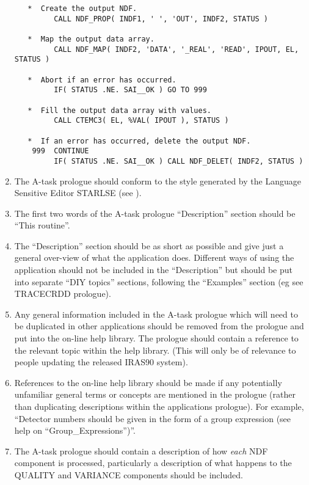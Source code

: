 \begin{enumerate}
\small
\begin{verbatim}
   *  Create the output NDF.
         CALL NDF_PROP( INDF1, ' ', 'OUT', INDF2, STATUS )

   *  Map the output data array.
         CALL NDF_MAP( INDF2, 'DATA', '_REAL', 'READ', IPOUT, EL, STATUS )

   *  Abort if an error has occurred.
         IF( STATUS .NE. SAI__OK ) GO TO 999

   *  Fill the output data array with values.
         CALL CTEMC3( EL, %VAL( IPOUT ), STATUS )

   *  If an error has occurred, delete the output NDF.
    999  CONTINUE
         IF( STATUS .NE. SAI__OK ) CALL NDF_DELET( INDF2, STATUS )
\end{verbatim}
\normalsize

\item The A-task prologue should conform to the style generated by the Language 
Sensitive Editor {\small STARLSE}
(see ).

\item The first two words of the A-task prologue ``Description'' section should be ``This 
routine''.

\item The ``Description'' section should be as short as possible and give just a
general over-view of what the application does. Different ways of using the
application should not be included in the ``Description'' but should be put into
separate ``DIY topics'' sections, following the ``Examples'' section (eg see
{\small TRACECRDD} prologue). 

\item Any general information included in the A-task prologue which will need to
be duplicated in other applications should be removed from the prologue and put
into the on-line help library. The prologue should contain a reference to the
relevant topic within the help library. (This will only be of relevance to
people updating the released {\small IRAS90} system). 

\item References to the on-line help library should be made if any potentially
unfamiliar general terms or concepts are mentioned in the prologue (rather than
duplicating descriptions within the applications prologue). For example,
``Detector numbers should be given in the form of a group expression (see help
on ``Group\_Expressions'')''. 

\item The A-task prologue should contain a description of how {\em each} {\small NDF}
component is processed, particularly a description of what happens to the
{\small QUALITY} and {\small VARIANCE} components should be included.


\end{enumerate}
